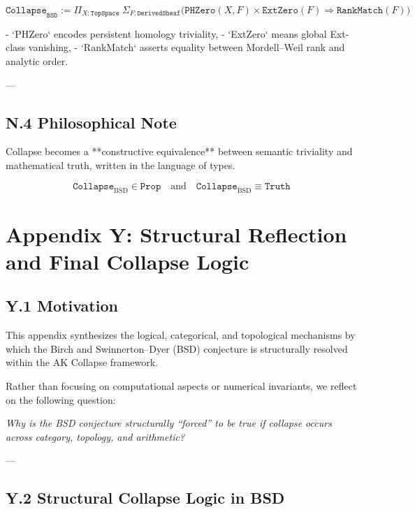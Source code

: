 \[
\texttt{Collapse}_{\texttt{BSD}} := 
\Pi_{X : \texttt{TopSpace}} \ \Sigma_{F : \texttt{DerivedSheaf}} \Big(
\texttt{PHZero}(X, F) \times \texttt{ExtZero}(F) \Rightarrow \texttt{RankMatch}(F)
\Big)
\]

- `PHZero` encodes persistent homology triviality,
- `ExtZero` means global Ext-class vanishing,
- `RankMatch` asserts equality between Mordell–Weil rank and analytic order.

---

\subsection*{N.4 Philosophical Note}

Collapse becomes a **constructive equivalence** between  
semantic triviality and mathematical truth, written in the language of types.

\[
\boxed{
\texttt{Collapse}_{\mathrm{BSD}} \in \texttt{Prop}
}
\quad \text{and} \quad
\texttt{Collapse}_{\mathrm{BSD}} \equiv \texttt{Truth}
\]



\section*{Appendix Y: Structural Reflection and Final Collapse Logic}

\subsection*{Y.1 Motivation}

This appendix synthesizes the logical, categorical, and topological mechanisms  
by which the Birch and Swinnerton–Dyer (BSD) conjecture is structurally resolved  
within the AK Collapse framework.

Rather than focusing on computational aspects or numerical invariants,  
we reflect on the following question:

\begin{center}
\textit{Why is the BSD conjecture structurally “forced” to be true  
if collapse occurs across category, topology, and arithmetic?}
\end{center}

---

\subsection*{Y.2 Structural Collapse Logic in BSD}

